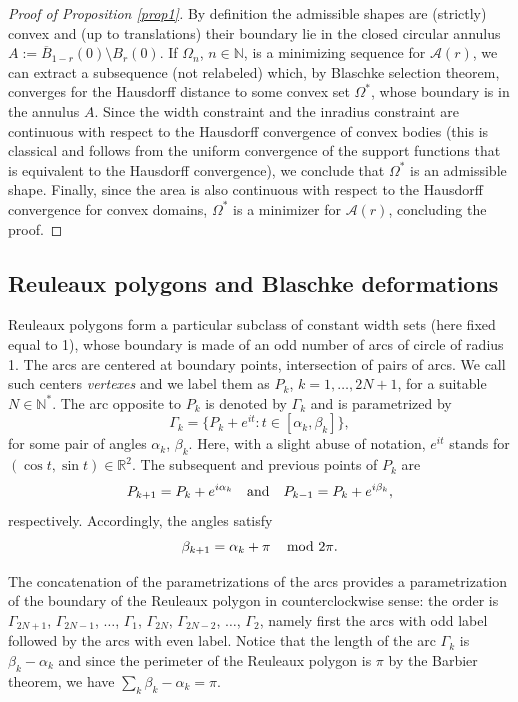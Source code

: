 \documentclass[11pt]{article}
\numberwithin{equation}{section}
\let\mathcal\mathscr
\let\sep :
\theoremstyle{plain}
\theoremstyle{definition}
\newcommand\A{\mathcal A}
\let\B\Gamma
\begin{document}
\begin{proof}[Proof of Proposition \ref{prop1}]
By definition the admissible shapes are (strictly) convex and (up to translations) their boundary lie in the closed circular annulus $A:=\overline{B}_{1-r}(0)\setminus B_r(0)$.
If $\Omega_n$, $n\in \mathbb N$, is a minimizing sequence for $\A(r)$, we can extract a subsequence (not relabeled) which, by Blaschke selection theorem, converges for the Hausdorff distance to some convex set $\Omega^*$, whose boundary is in the annulus $A$.
{Since the width constraint and the inradius constraint are continuous with respect to the Hausdorff convergence of convex bodies (this is classical and follows from the uniform convergence
of the support functions that is equivalent to the Hausdorff convergence), we conclude that $\Omega^*$ is an admissible shape.} Finally, since the area is also continuous with respect to the Hausdorff convergence for convex domains, $\Omega^*$ is a minimizer for $\A(r)$, concluding the proof.
\end{proof}

\subsection{Reuleaux polygons and Blaschke deformations}

Reuleaux polygons form a particular subclass of constant width sets (here fixed equal to 1), whose boundary is made of an odd number of arcs of circle of radius 1.
The arcs are centered at boundary points, intersection of pairs of arcs. We call such centers \emph{vertexes} and we label them as $P_k$, $k=1,\ldots, 2N+1$, for a suitable $N\in \mathbb N^*$. The arc opposite to $P_k$ is denoted by $\B_k$ and is parametrized by
\[
\B_k=\{P_k + e^{it}\sep t\in [\alpha_k, \beta_k]\},
\]
for some pair of angles $\alpha_k$, $\beta_k$. Here, with a slight abuse of notation, $e^{it}$ stands for $(\cos t, \sin t)\in \mathbb R^2$. The subsequent and previous points of $P_k$ are
\[
P_{k+1}=P_k + e^{i\alpha_k}\quad \hbox{and}\quad P_{k-1}=P_{k} + e^{i\beta_k},
\]
respectively. Accordingly, the angles satisfy
\[
\beta_{k+1}= \alpha_k +\pi \,\quad \hbox{mod }2\pi.
\]

The concatenation of the parametrizations of the arcs provides a parametrization of the boundary of the Reuleaux polygon in counterclockwise sense: the order is $\B_{2N+1}$, $\B_{2N-1}$, $\ldots$, $\B_{1}$, $\B_{2N}$, $\B_{2N-2}$, $\ldots$, $\B_2$, namely first the arcs with odd label followed by the arcs with even label.
Notice that the length of the arc $\B_k$ is $\beta_k-\alpha_k$ and since the perimeter of the Reuleaux polygon is $\pi$ by the Barbier theorem, we have $\sum_k \beta_k - \alpha_k =\pi$.
\end{document}
